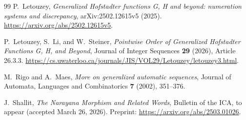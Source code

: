 \documentclass[11pt,a4paper]{article}
\numberwithin{equation}{section}
\theoremstyle{remark}
\begin{document}
\begin{thebibliography}{99}
P.~Letouzey,
\emph{Generalized Hofstadter functions G, H and beyond: numeration systems
and discrepancy}, arXiv:2502.12615v5 (2025).
\url{https://arxiv.org/abs/2502.12615v5}.

P.~Letouzey, S.~Li, and W.~Steiner,
\emph{Pointwise Order of Generalized Hofstadter Functions G, H, and Beyond},
Journal of Integer Sequences \textbf{29} (2026), Article 26.3.3.
\url{https://cs.uwaterloo.ca/journals/JIS/VOL29/Letouzey/letouzey3.html}.

M.~Rigo and A.~Maes,
\emph{More on generalized automatic sequences},
Journal of Automata, Languages and Combinatorics \textbf{7} (2002), 351--376.

J.~Shallit,
\emph{The Narayana Morphism and Related Words},
Bulletin of the ICA, to appear (accepted March 26, 2026).
Preprint:
\url{https://arxiv.org/abs/2503.01026}.
\end{thebibliography}
\end{document}
